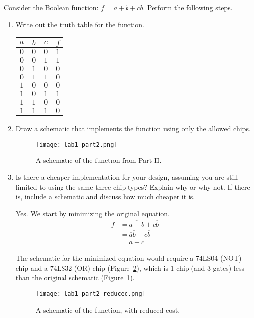 \documentclass{article}
\begin{document}
Consider the Boolean function: $f = \overline{a + b} + c\overline{b}$.
Perform the following steps.

\begin{enumerate}

\item Write out the truth table for the function.

\begin{center}
\begin{tabular}{ccc|c}
$a$&$b$&$c$&$f$\\
\hline
$0$&$0$&$0$&$1$\\
$0$&$0$&$1$&$1$\\
$0$&$1$&$0$&$0$\\
$0$&$1$&$1$&$0$\\
$1$&$0$&$0$&$0$\\
$1$&$0$&$1$&$1$\\
$1$&$1$&$0$&$0$\\
$1$&$1$&$1$&$0$\\
\end{tabular}
\end{center}

\item Draw a schematic that implements the function using only the allowed chips.

\begin{figure}[!ht]
    \centering
    \texttt{[image: lab1\_part2.png]}
    \caption{A schematic of the function from Part II.}
    \label{f:part2}
\end{figure}

\item Is there a cheaper implementation for your design, assuming you are still limited to using the same three chip types?
    Explain why or why not.
    If there is, include a schematic and discuss how much cheaper it is.

Yes. We start by minimizing the original equation.
\begin{align*}
    f   &= \overline{a + b} + c\overline{b}\\
        &= \overline{a}\overline{b} + c\overline{b}\\
        &= \overline{a} + c
\end{align*}

The schematic for the minimized equation would require a 74LS04 (NOT) chip and a 74LS32 (OR) chip (Figure~\ref{f:part2_reduced}), which is 1 chip (and 3 gates) less than the original schematic (Figure~\ref{f:part2}).

\begin{figure}[!ht]
    \centering
    \texttt{[image: lab1\_part2\_reduced.png]}
    \caption{A schematic of the function, with reduced cost.}
    \label{f:part2_reduced}
\end{figure}

\end{enumerate}
\end{document}
